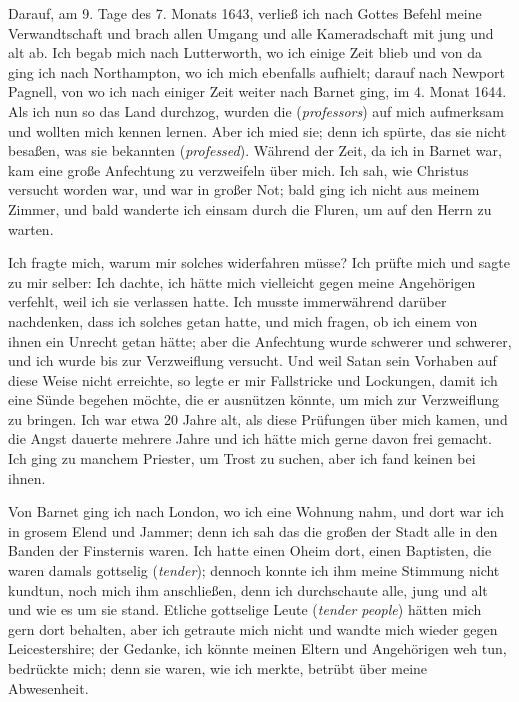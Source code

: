 Darauf, am 9. Tage des 7. Monats 1643, 
verließ ich nach
Gottes Befehl meine Verwandtschaft und brach allen Umgang und
alle Kameradschaft mit jung und alt ab. Ich begab mich nach
Lutterworth, wo ich einige Zeit blieb 
und von da ging ich nach
Northampton, wo ich mich ebenfalls 
aufhielt; darauf nach Newport
Pagnell, von wo ich nach einiger Zeit weiter nach Barnet
ging, im 4. Monat 1644. Als ich nun so das Land durchzog,
wurden die  (\textit{professors}) 
auf mich aufmerksam und
wollten mich kennen lernen. Aber ich mied sie; denn ich spürte,
das sie nicht besaßen, was sie bekannten (\textit{professed}). Während
der Zeit, da ich in Barnet war, kam eine 
große Anfechtung zu
verzweifeln über mich. Ich sah, wie Christus versucht worden
war, und war in großer Not; bald ging ich nicht aus meinem
Zimmer, und bald wanderte ich einsam durch die Fluren, um auf
den Herrn zu warten.

Ich fragte mich, warum mir solches widerfahren müsse? Ich
prüfte mich und sagte zu mir selber:  
Ich dachte, ich hätte mich vielleicht gegen meine Angehörigen 
verfehlt, weil ich sie verlassen hatte. Ich musste immerwährend 
darüber nachdenken, dass ich solches getan hatte, und
mich fragen, ob ich einem von ihnen ein Unrecht getan hätte;
aber die Anfechtung wurde schwerer und schwerer, und ich wurde
bis zur Verzweiflung versucht. Und weil Satan sein Vorhaben
auf diese Weise nicht erreichte, so legte er mir Fallstricke und
Lockungen, damit ich eine Sünde begehen möchte, die er ausnützen 
könnte, um mich zur Verzweiflung zu bringen. Ich war
etwa 20 Jahre alt, als diese Prüfungen über mich kamen, und
die Angst dauerte mehrere Jahre und ich hätte mich gerne davon
frei gemacht. Ich ging zu manchem Priester, um Trost zu suchen,
aber ich fand keinen bei ihnen.

Von Barnet ging ich nach London, wo ich eine 
Wohnung nahm,
und dort war ich in grosem Elend und Jammer; denn ich sah
das die großen  der Stadt alle in den Banden der
Finsternis waren. Ich hatte einen Oheim dort, 
einen Baptisten,
die waren damals gottselig (\textit{tender}); dennoch 
konnte ich ihm meine
Stimmung nicht kundtun, noch mich ihm anschließen, denn ich
durchschaute alle, jung und alt und wie es um sie stand. Etliche
gottselige Leute (\textit{tender people}) hätten 
mich gern dort behalten,
aber ich getraute mich nicht und wandte mich wieder gegen
Leicestershire; der Gedanke, ich könnte meinen Eltern und Angehörigen 
weh tun, bedrückte mich; denn sie waren, wie ich merkte,
betrübt über meine Abwesenheit.

